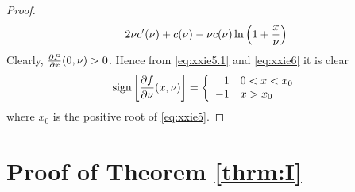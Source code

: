 \documentclass{article}
\begin{document}
\begin{proof}
\begin{eqnarray}
    2 \nu c'(\nu) + c(\nu) - \nu c(\nu) \ln\left(
      1 + {x \over \nu}
    \right)
    \label{eq:xxie6}
  \end{eqnarray}
  Clearly, $\frac{\partial P}{\partial x}(0, \nu) > 0$. Hence from \eqref{eq:xxie5.1} and
  \eqref{eq:xxie6} it is clear
  \begin{equation*}
    \text{sign}\left[
      \frac{\partial f}{\partial \nu}(x, \nu)
    \right]
    = \left\{
    \begin{array}{rl}
      1 & 0 < x < x_0 \\
      -1 & x > x_0
    \end{array}
    \right.
  \end{equation*}
  where $x_0$ is the positive root of \eqref{eq:xxie5}.
\end{proof}

\section{Proof of Theorem \ref{thrm:I}}
\label{sec:thrmI_proof}
\end{document}

